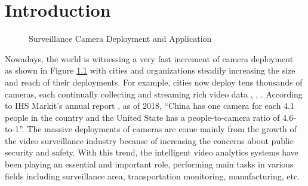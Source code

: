 \chapter{Introduction}  %
\begin{figure}
\centering
{}
\caption{Surveillance Camera Deployment and Application}
\label{fig:cctv}
\end{figure}
Nowadays, the world is witnessing a very fast increment of camera deployment ~\citep{ananthanarayanan2019demo} as shown in Figure \ref{fig:cctv} with cities and organizations steadily increasing the size and reach of their deployments. For example, cities now deploy tens thousands of cameras, each continually collecting and streaming rich video data \cite{ref0}, \cite{ref1}, \cite{ref2}. According to IHS Markit’s annual report \cite{oliverreport}, as of 2018, “China has one camera for each 4.1 people in the country and the United State has a people-to-camera ratio of 4.6-to-1”. The massive deployments of cameras are come mainly from the growth of the video surveillance industry because of increasing the concerns about public security and safety. With this trend, the intelligent video analytics systems have been playing an essential and important role, performing main tasks in various fields including surveillance area, transportation monitoring, manufacturing, etc.
